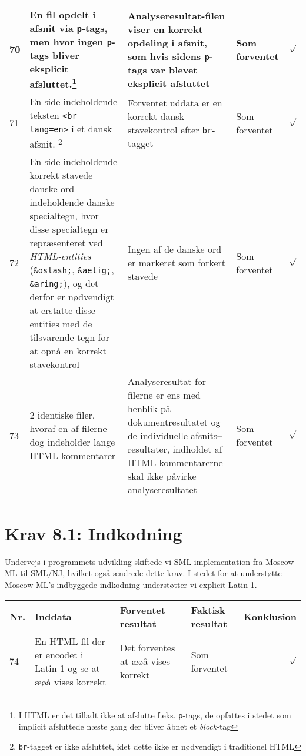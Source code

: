 \documentclass[a4paper,oneside,article]{memoir}
\begin{document}
\begin{landscape}
\begin{longtable}[c]{p{20pt}|p{220pt}|p{130pt}|p{130pt}|p{50pt}}
70 &
En fil opdelt i afsnit via \texttt{p}-tags, men hvor ingen
\texttt{p}-tags bliver eksplicit afsluttet.\footnote{I HTML er det
  tilladt ikke at afslutte f.eks. \texttt{p}-tags, de opfattes i
  stedet som implicit afsluttede næste gang der bliver åbnet et
  \textit{block}-tag} &
Analyseresultat-filen viser en korrekt opdeling i afsnit, som hvis
sidens \texttt{p}-tags var blevet eksplicit afsluttet &
Som forventet &
$\surd$ \\ \hline

71 &
En side indeholdende teksten \texttt{<br lang=en>} i et dansk
afsnit. \footnote{\texttt{br}-tagget er ikke afsluttet, idet dette
  ikke er nødvendigt i traditionel HTML} &
Forventet uddata er en korrekt dansk stavekontrol efter
\texttt{br}-tagget &
Som forventet &
$\surd$ \\ \hline

72 &
En side indeholdende korrekt stavede danske ord indeholdende danske
specialtegn, hvor disse specialtegn er repræsenteret ved
\textit{HTML-entities} (\texttt{\&oslash;}, \texttt{\&aelig;},
\texttt{\&aring;}), og det derfor er nødvendigt at erstatte disse
entities med de tilsvarende tegn for at opnå en korrekt stavekontrol &
Ingen af de danske ord er markeret som forkert stavede &
Som forventet &
$\surd$ \\ \hline

73 &
2 identiske filer, hvoraf en af filerne dog indeholder lange HTML-kommentarer &
Analyseresultat for filerne er ens med henblik på
dokumentresultatet og de individuelle afsnits--resultater, indholdet
af HTML-kommentarerne skal ikke påvirke analyseresultatet &
Som forventet &
$\surd$ \\ \hline

\end{longtable}

\section{Krav 8.1: Indkodning}

Undervejs i programmets udvikling skiftede vi SML-implementation fra
Moscow ML til SML/NJ, hvilket også ændrede dette krav. I stedet for at
understøtte Moscow ML's indbyggede indkodning understøtter vi explicit
Latin-1.

\begin{longtable}[c]{p{20pt}|p{220pt}|p{130pt}|p{130pt}|r}
\textbf{Nr.} &
\textbf{Inddata} &
\textbf{Forventet resultat} &
\textbf{Faktisk resultat} &
\textbf{Konklusion} \\ \hline

74 &
En HTML fil der er encodet i Latin-1 og se at æøå vises korrekt &
Det forventes at æøå vises korrekt &
Som forventet &
$\surd$ \\ \hline

\end{longtable}
\end{landscape}
\end{document}
